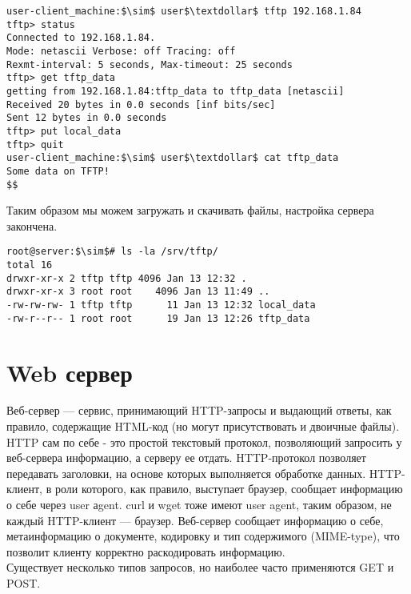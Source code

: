 \documentclass[14pt, a4paper]{article}
\begin{document}
\vspace{0.3cm}
\begin{lstlisting}
user-client_machine:$\sim$ user$\textdollar$ tftp 192.168.1.84
tftp> status
Connected to 192.168.1.84.
Mode: netascii Verbose: off Tracing: off
Rexmt-interval: 5 seconds, Max-timeout: 25 seconds
tftp> get tftp_data
getting from 192.168.1.84:tftp_data to tftp_data [netascii]
Received 20 bytes in 0.0 seconds [inf bits/sec]
Sent 12 bytes in 0.0 seconds
tftp> put local_data
tftp> quit
user-client_machine:$\sim$ user$\textdollar$ cat tftp_data
Some data on TFTP!
$$
\end{lstlisting}
\vspace{0.2cm}

Таким образом мы можем загружать и скачивать файлы, настройка сервера закончена.

\vspace{0.3cm}
\begin{lstlisting}
root@server:$\sim$# ls -la /srv/tftp/
total 16
drwxr-xr-x 2 tftp tftp 4096 Jan 13 12:32 .
drwxr-xr-x 3 root root    4096 Jan 13 11:49 ..
-rw-rw-rw- 1 tftp tftp      11 Jan 13 12:32 local_data
-rw-r--r-- 1 root root      19 Jan 13 12:26 tftp_data
\end{lstlisting}

\section*{Web сервер} 

Веб-сервер — сервис, принимающий HTTP-запросы и выдающий ответы, как правило, содержащие
HTML-код (но могут присутствовать и двоичные файлы).\\

HTTP сам по себе - это простой текстовый протокол, позволяющий запросить у веб-сервера
информацию, а серверу ее отдать. HTTP-протокол позволяет передавать заголовки, на основе
которых выполняется обработке данных. HTTP-клиент, в роли которого, как правило, выступает
браузер, сообщает информацию о себе через user аgent. curl и wget тоже имеют user agent, таким
образом, не каждый HTTP-клиент — браузер. Веб-сервер сообщает информацию о себе,
метаинформацию о документе, кодировку и тип содержимого (MIME-type), что позволит клиенту
корректно раскодировать информацию.\\

Существует несколько типов запросов, но наиболее часто применяются GET и POST.\\
\end{document}

